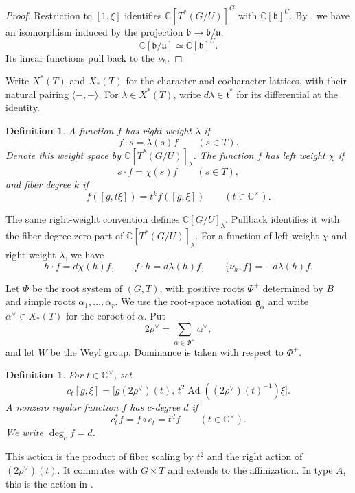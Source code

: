 \documentclass[12pt]{article}
\theoremstyle{paperplain}
\theoremstyle{paperdefinition}
\newtheorem{definition}[theorem]{Definition}
\DeclareMathOperator{\Ad}{Ad}
\newcommand{\C}{\mathbb C}
\newcommand{\g}{\mathfrak g}
\newcommand{\tfrak}{\mathfrak t}
\begin{document}
\begin{proof}
    Restriction to $[1,\xi]$ identifies $\C[T^*(G/U)]^G$ with $\C[\mathfrak b]^U$. By \cite[Section~7.3, before Lemma~7.3.3]{GinzburgKazhdan}, we have an isomorphism induced by the projection $\mathfrak b\to\mathfrak b/\mathfrak u$,
    $$
        \C[\mathfrak b/\mathfrak u]\simeq\C[\mathfrak b]^U.
    $$
    Its linear functions pull back to the $\nu_h$.
\end{proof}

Write $X^*(T)$ and $X_*(T)$ for the character and cocharacter lattices, with their natural pairing $\langle-,-\rangle$. For $\lambda\in X^*(T)$, write $d\lambda\in\tfrak^*$ for its differential at the identity.

\begin{definition}\label{def:weights}
    A function $f$ has \emph{right weight} $\lambda$ if
    $$
        f\cdot s=\lambda(s)f\qquad(s\in T).
    $$
    Denote this weight space by $\C[T^*(G/U)]_\lambda$. The function $f$ has \emph{left weight} $\chi$ if
    $$
        s\cdot f=\chi(s)f\qquad(s\in T),
    $$
    and \emph{fiber degree} $k$ if
    $$
        f([g,t\xi])=t^kf([g,\xi])\qquad(t\in\C^\times).
    $$
\end{definition}

The same right-weight convention defines $\C[G/U]_\lambda$. Pullback identifies it with the fiber-degree-zero part of $\C[T^*(G/U)]_\lambda$. For a function of left weight $\chi$ and right weight $\lambda$, we have
$$
    h\cdot f=d\chi(h)f,\qquad
    f\cdot h=d\lambda(h)f,\qquad
    \{\nu_h,f\}=-d\lambda(h)f.
$$

Let $\Phi$ be the root system of $(G,T)$, with positive roots $\Phi^+$ determined by $B$ and simple roots $\alpha_1,\ldots,\alpha_r$. We use the root-space notation $\g_\alpha$ and write $\alpha^\vee\in X_*(T)$ for the coroot of $\alpha$. Put
$$
    2\rho^\vee=\sum_{\alpha\in\Phi^+}\alpha^\vee,
$$
and let $W$ be the Weyl group. Dominance is taken with respect to $\Phi^+$.

\begin{definition}\label{def:conical-action}
    For $t\in\C^\times$, set
    $$
        c_t[g,\xi]
        =\bigl[g(2\rho^\vee)(t),\,
        t^2\Ad((2\rho^\vee)(t)^{-1})\xi\bigr].
    $$
    A nonzero regular function $f$ has \emph{$c$-degree} $d$ if
    $$
        c_t^*f=f\circ c_t=t^df\qquad(t\in\C^\times).
    $$
    We write $\deg_c f=d$.
\end{definition}

This action is the product of fiber scaling by $t^2$ and the right action of $(2\rho^\vee)(t)$. It commutes with $G\times T$ and extends to the affinization. In type $A$, this is the action in \cite[Definition~5.3 and Proposition~5.5]{JiaVOne}.
\end{document}
